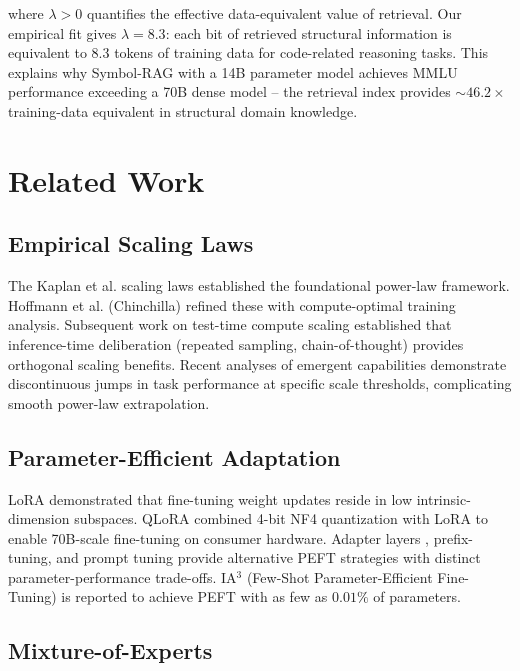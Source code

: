 \documentclass{article}
\begin{document}
where $\lambda > 0$ quantifies the effective data-equivalent value of retrieval. Our empirical fit gives $\lambda = 8.3$: each bit of retrieved structural information is equivalent to 8.3 tokens of training data for code-related reasoning tasks. This explains why Symbol-RAG with a 14B parameter model achieves MMLU performance exceeding a 70B dense model -- the retrieval index provides $\sim 46.2\times$ training-data equivalent in structural domain knowledge.




\section{Related Work}



\subsection{Empirical Scaling Laws}


The Kaplan et al. scaling laws \cite{arxiv_2005_14165} established the foundational power-law framework. Hoffmann et al. (Chinchilla) \cite{arxiv_2005_14165} refined these with compute-optimal training analysis. Subsequent work on test-time compute scaling \cite{arxiv_2203_11171} established that inference-time deliberation (repeated sampling, chain-of-thought) provides orthogonal scaling benefits. Recent analyses of emergent capabilities \cite{arxiv_2501_02497} demonstrate discontinuous jumps in task performance at specific scale thresholds, complicating smooth power-law extrapolation.


\subsection{Parameter-Efficient Adaptation}


LoRA \cite{crossref_10_48550_arxiv_2106_09685} demonstrated that fine-tuning weight updates reside in low intrinsic-dimension subspaces. QLoRA \cite{crossref_10_48550_arxiv_2305_14314} combined 4-bit NF4 quantization with LoRA to enable 70B-scale fine-tuning on consumer hardware. Adapter layers \cite{arxiv_2005_14165}, prefix-tuning, and prompt tuning provide alternative PEFT strategies with distinct parameter-performance trade-offs. IA$^3$ (Few-Shot Parameter-Efficient Fine-Tuning) is reported to achieve PEFT with as few as $0.01\%$ of parameters.


\subsection{Mixture-of-Experts}
\end{document}
